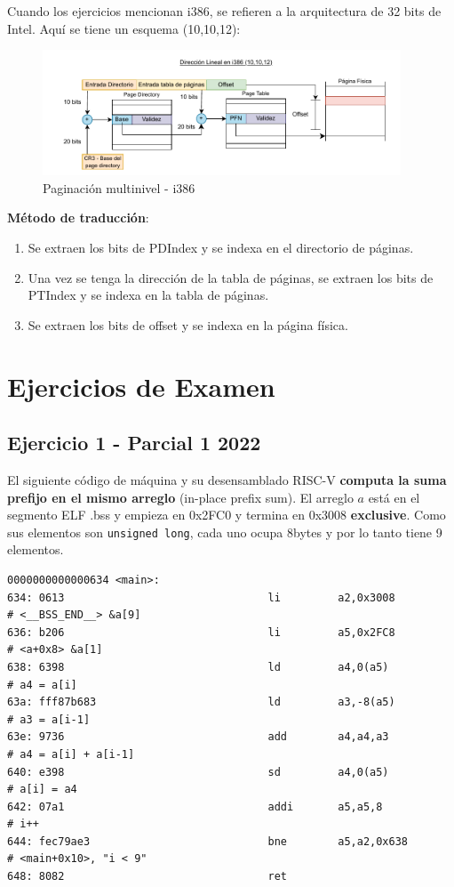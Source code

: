 \documentclass{article}
\begin{document}
Cuando los ejercicios mencionan i386, se refieren a la arquitectura de 32 bits de Intel. Aquí se tiene un esquema (10,10,12):

\begin{figure}[h]
    \centering
    \includegraphics[width=0.95\textwidth]{src/i386.pdf}
    \caption{Paginación multinivel - i386}
\end{figure}

\textbf{Método de traducción}:
\begin{enumerate}
    \item Se extraen los bits de PDIndex y se indexa en el directorio de páginas.
    \item Una vez se tenga la dirección de la tabla de páginas, se extraen los bits de PTIndex y se indexa en la tabla de páginas.
    \item Se extraen los bits de offset y se indexa en la página física.
\end{enumerate}

\newpage
\section{Ejercicios de Examen}
\subsection{Ejercicio 1 - Parcial 1 2022}
El siguiente código de máquina y su desensamblado RISC-V \textbf{computa la suma prefijo en el mismo arreglo} (in-place prefix sum). El arreglo $a$ está en el segmento ELF .bss y empieza en 0x2FC0 y termina en 0x3008 \textbf{exclusive}. Como sus elementos son \texttt{unsigned long}, cada uno ocupa 8bytes y por lo tanto tiene 9 elementos.

\begin{verbatim}
0000000000000634 <main>:
634: 0613                                li         a2,0x3008         # <__BSS_END__> &a[9]
636: b206                                li         a5,0x2FC8         # <a+0x8> &a[1]
638: 6398                                ld         a4,0(a5)          # a4 = a[i]
63a: fff87b683                           ld         a3,-8(a5)         # a3 = a[i-1]
63e: 9736                                add        a4,a4,a3          # a4 = a[i] + a[i-1]
640: e398                                sd         a4,0(a5)          # a[i] = a4
642: 07a1                                addi       a5,a5,8           # i++
644: fec79ae3                            bne        a5,a2,0x638       # <main+0x10>, "i < 9"
648: 8082                                ret
\end{verbatim}
\end{document}
